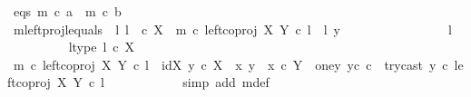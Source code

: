 \begin{isabellebody}
\ eqs{\isacharcolon}{\kern0pt}\ {\isachardoublequoteopen}m\ {\isasymcirc}\isactrlsub c\ a\ {\isacharequal}{\kern0pt}\ m\ {\isasymcirc}\isactrlsub c\ b{\isachardoublequoteclose}\isanewline
\isanewline
\ \ \ \ \ \ \isamarkupfalse%
\ m{\isacharunderscore}{\kern0pt}leftproj{\isacharunderscore}{\kern0pt}l{\isacharunderscore}{\kern0pt}equals{\isacharcolon}{\kern0pt}\ {\isachardoublequoteopen}{\isasymAnd}\ l{\isachardot}{\kern0pt}\ l\ \ {\isasymin}\isactrlsub c\ X\ {\isasymLongrightarrow}\ m\ {\isasymcirc}\isactrlsub c\ left{\isacharunderscore}{\kern0pt}coproj\ X\ Y\ {\isasymcirc}\isactrlsub c\ l\ {\isacharequal}{\kern0pt}\ {\isasymlangle}l{\isacharcomma}{\kern0pt}\ y{}{\isasymrangle}{\isachardoublequoteclose}\isanewline
\ \ \ \ \ \ \isamarkupfalse%
{\isacharminus}{\kern0pt}\isanewline
\ \ \ \ \ \ \ \ \isamarkupfalse%
\ l\ \isanewline
\ \ \ \ \ \ \ \ \isamarkupfalse%
\ l{\isacharunderscore}{\kern0pt}type{\isacharcolon}{\kern0pt}\ {\isachardoublequoteopen}l\ {\isasymin}\isactrlsub c\ X{\isachardoublequoteclose}\isanewline
\ \ \ \ \ \ \ \ \isamarkupfalse%
\ {\isachardoublequoteopen}m\ {\isasymcirc}\isactrlsub c\ left{\isacharunderscore}{\kern0pt}coproj\ X\ Y\ {\isasymcirc}\isactrlsub c\ l\ {\isacharequal}{\kern0pt}\ {\isacharparenleft}{\kern0pt}{\isasymlangle}id{\isacharparenleft}{\kern0pt}X{\isacharparenright}{\kern0pt}{\isacharcomma}{\kern0pt}\ y{}\ {\isasymcirc}\isactrlsub c\ {\isasymbeta}\isactrlbsub X\isactrlesub {\isasymrangle}\ {\isasymamalg}\ {\isacharparenleft}{\kern0pt}{\isacharparenleft}{\kern0pt}{\isasymlangle}x{}{\isacharcomma}{\kern0pt}\ y{}{\isasymrangle}\ {\isasymamalg}\ {\isasymlangle}x{}\ {\isasymcirc}\isactrlsub c\ {\isasymbeta}\isactrlbsub Y\ {\isasymsetminus}\ {\isacharparenleft}{\kern0pt}one{\isacharcomma}{\kern0pt}y{}{\isacharparenright}{\kern0pt}\isactrlesub {\isacharcomma}{\kern0pt}\ y{}\isactrlsup c{\isasymrangle}{\isacharparenright}{\kern0pt}\ {\isasymcirc}\isactrlsub c\ \ try{\isacharunderscore}{\kern0pt}cast\ y{}{\isacharparenright}{\kern0pt}{\isacharparenright}{\kern0pt}\ {\isasymcirc}\isactrlsub c\ left{\isacharunderscore}{\kern0pt}coproj\ X\ Y\ {\isasymcirc}\isactrlsub c\ l{\isachardoublequoteclose}\isanewline
\ \ \ \ \ \ \ \ \ \ \isamarkupfalse%
\ {\isacharparenleft}{\kern0pt}simp\ add{\isacharcolon}{\kern0pt}\ m{\isacharunderscore}{\kern0pt}def{\isacharparenright}{\kern0pt}\isanewline
\ \ \ \ \ \ \ \ \isamarkupfalse%
\ \isamarkupfalse%

\end{isabellebody}
